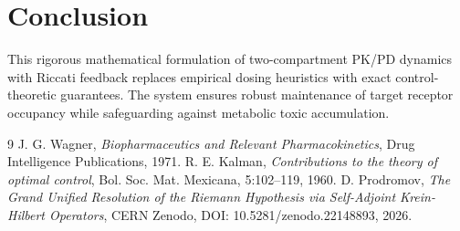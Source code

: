 \documentclass[11pt,a4paper]{article}
\theoremstyle{definition}
\begin{document}
\section{Conclusion}
This rigorous mathematical formulation of two-compartment PK/PD dynamics with Riccati feedback replaces empirical dosing heuristics with exact control-theoretic guarantees. The system ensures robust maintenance of target receptor occupancy while safeguarding against metabolic toxic accumulation.

\begin{thebibliography}{9}
 J. G. Wagner, \emph{Biopharmaceutics and Relevant Pharmacokinetics}, Drug Intelligence Publications, 1971.
 R. E. Kalman, \emph{Contributions to the theory of optimal control}, Bol. Soc. Mat. Mexicana, 5:102--119, 1960.
 D. Prodromov, \emph{The Grand Unified Resolution of the Riemann Hypothesis via Self-Adjoint Krein-Hilbert Operators}, CERN Zenodo, DOI: 10.5281/zenodo.22148893, 2026.
\end{thebibliography}
\end{document}

